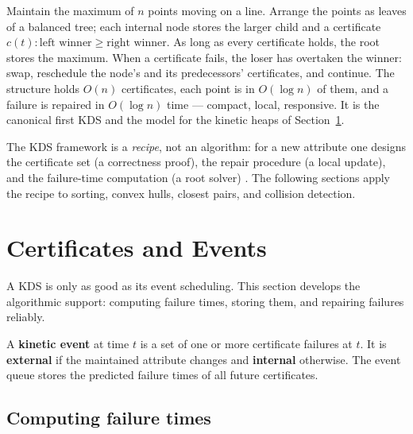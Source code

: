 \begin{example}\label{ex:kinetic_tournament}
  Maintain the maximum of $n$ points moving on a line. Arrange the points
  as leaves of a balanced tree; each internal node stores the larger child
  and a certificate $c(t) : \text{left winner} \ge \text{right winner}$. As
  long as every certificate holds, the root stores the maximum. When a
  certificate fails, the loser has overtaken the winner: swap, reschedule
  the node's and its predecessors' certificates, and continue. The structure
  holds $O(n)$ certificates, each point is in $O(\log n)$ of them, and a
  failure is repaired in $O(\log n)$ time --- compact, local, responsive. It
  is the canonical first KDS and the model for the kinetic heaps of
  Section~\ref{sec:dynamic_certificates}.
\end{example}

\begin{remark}
  The KDS framework is a \emph{recipe}, not an algorithm: for a new attribute
  one designs the certificate set (a correctness proof), the repair
  procedure (a local update), and the failure-time computation (a root
  solver) \cite{guibas1998}. The following sections apply the recipe to
  sorting, convex hulls, closest pairs, and collision detection.
\end{remark}


\section{Certificates and Events}
\label{sec:dynamic_certificates}

A KDS is only as good as its event scheduling. This section develops the
algorithmic support: computing failure times, storing them, and repairing
failures reliably.

\begin{definition}\label{def:kinetic_event}
  A \textbf{kinetic event} at time $t$ is a set of one
  or more certificate failures at $t$. It is \textbf{external} if the
  maintained attribute changes and \textbf{internal} otherwise. The event
  queue stores the predicted failure times of all future certificates.
\end{definition}

\subsection*{Computing failure times}

